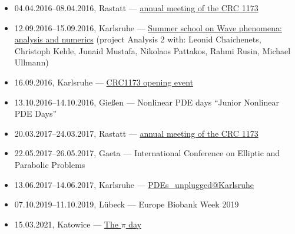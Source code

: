 \begin{itemize}
  \item 04.04.2016--08.04.2016, Rastatt --- \href{\urlFirstAnnualCrc}{ annual meeting of the CRC 1173}
  \item 12.09.2016--15.09.2016, Karlsruhe --- \href{https://www.waves.kit.edu/summerschool2016.php}{Summer school on Wave phenomena: analysis and numerics} (project Analysis 2 with: Leonid Chaichenets, Christoph Kehle, Junaid Mustafa, Nikolaos Pattakos, Rahmi Rusin, Michael Ullmann)
  \item 16.09.2016, Karlsruhe --- \href{https://www.waves.kit.edu/openingevent.php}{CRC1173 opening event}
  \item 13.10.2016--14.10.2016, Gießen --- Nonlinear PDE days ``Junior Nonlinear PDE Days''
  \item 20.03.2017--24.03.2017, Rastatt --- \href{\urlSecondAnnualCrc}{ annual meeting of the CRC 1173}
  \item 22.05.2017--26.05.2017, Gaeta --- International Conference on Elliptic and Parabolic Problems
  \item 13.06.2017--14.06.2017, Karlsruhe --- \href{https://www.math.kit.edu/iana2/event/pdeunplugrei_17/en}{PDEs\_unplugged@Karlsruhe}
  \item 07.10.2019--11.10.2019, Lübeck --- Europe Biobank Week 2019
  \item 15.03.2021, Katowice --- \href{\urlPiXV}{The $\pi$ day}
\end{itemize}
